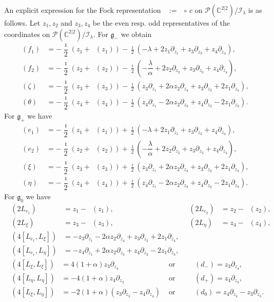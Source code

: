 \documentclass{amsart}
\numberwithin{theorem}{section}
\theoremstyle{definition}
\theoremstyle{remark}
\DeclareMathOperator{\bessel}{\mathcal B_\lambda}
\newcommand{\pt}[1]{\partial_{#1}}
\newcommand{\mf}[1]{\mathfrak{#1}}
\newcommand{\mc}[1]{\mathcal{#1}}
\DeclareMathOperator{\pil}{\pi_\lambda}
\DeclareMathOperator{\rol}{\rho_\lambda}
\begin{document}
An explicit expression for the Fock representation $\rol := \pil\circ \,c$ on $\mc{P} (\mathds{C}^{2 |2}) / \mc{I}_\lambda$ 
is as follows. Let $z_1,z_2$ and $z_3,z_4$ be the even resp. odd representatives of the coordinates on $\mc{P} (\mathds{C}^{2 |2}) / \mc{I}_\lambda$. 
For $\mf g_-$ we obtain
\begin{align*}
\rol(f_1) &= -\dfrac{\imath}{2}(z_1 + \bessel(z_1)) -\frac{\imath}{2}(-\lambda +2z_1\pt {z_1} + z_3 \pt {z_3} + z_4\pt {z_4}),\\
\rol(f_2) &= -\dfrac{\imath}{2}(z_2 + \bessel(z_2)) -\frac{\imath}{2}(-\dfrac{\lambda}{\alpha} +2z_2\pt {z_2} + z_3 \pt {z_3} + z_4\pt {z_4}),\\
\rol(\zeta) &= -\dfrac{\imath}{2}(z_3 + \bessel(z_3)) -\frac{\imath}{2}(z_3\pt {z_1} + 2\alpha z_2\pt {z_4} +z_3\pt {z_2} + 2 z_1\pt {z_4}),\\
\rol(\theta) &= -\dfrac{\imath}{2}(z_4 + \bessel(z_4)) -\frac{\imath}{2}(z_4\pt {z_1} - 2\alpha z_2\pt {z_3} +z_4\pt {z_2} - 2 z_1\pt {z_3}).
\end{align*}
For $\mf g_+$ we have
\begin{align*}
\rol(e_1) &= -\dfrac{\imath}{2}(z_1 + \bessel(z_1)) +\frac{\imath}{2}(-\lambda +2z_1\pt {z_1} + z_3 \pt {z_3} + z_4\pt {z_4}),\\
\rol(e_2) &= -\dfrac{\imath}{2}(z_2 + \bessel(z_2)) +\frac{\imath}{2}(-\dfrac{\lambda}{\alpha} +2z_2\pt {z_2} + z_3 \pt {z_3} + z_4\pt {z_4}),\\
\rol(\xi) &= -\dfrac{\imath}{2}(z_3 + \bessel(z_3)) +\frac{\imath}{2}(z_3\pt {z_1} + 2\alpha z_2\pt {z_4} +z_3\pt {z_2} + 2 z_1\pt {z_4}),\\
\rol(\eta) &= -\dfrac{\imath}{2}(z_4 + \bessel(z_4)) +\frac{\imath}{2}(z_4\pt {z_1} - 2\alpha z_2\pt {z_3} + z_4\pt {z_2} - 2 z_1\pt {z_3}).
\end{align*}
For $\mf g_0$ we have
\begin{align*}
\rol(2L_{e_1}) &=z_1-\bessel(z_1), &\rol(2L_{e_2}) &= z_2-\bessel(z_2),\\
\rol(2L_{\xi}) &= z_3-\bessel(z_3), &\rol(2L_{\eta}) &= z_4-\bessel(z_4),\\
\rol(4[L_{e_1},L_{\xi}]) &=  -z_3\pt {z_1} - 2\alpha z_2\pt {z_4} +z_3\pt {z_2} + 2 z_1\pt {z_4},\\
\rol(4[L_{e_1},L_{\eta}]) &=  -{z_4}\pt {z_1} + 2\alpha z_2\pt {z_3} + z_4\pt {z_2} - 2 z_1\pt {z_3},
\end{align*}
\begin{align*}
\rol(4[L_{\xi},L_{\xi}]) &= 4(1+\alpha)z_3\pt {z_4} &\text{ or }\quad &\rol(d_-) = z_3\pt {z_4},\\
\rol(4[L_{\eta},L_{\eta}]) &= -4(1+\alpha)z_4\pt {z_3} &\text{ or }\quad &\rol(d_+) = z_4\pt {z_3},\\
\rol(4[L_{\xi},L_{\eta}]) &= -2(1+\alpha)(z_3\pt {z_3}  -z_4\pt {z_4}) &\text{ or }\quad &\rol(d_0) = z_4\pt {z_4} - {z_3}\pt {z_3}.
\end{align*}
\end{document}
